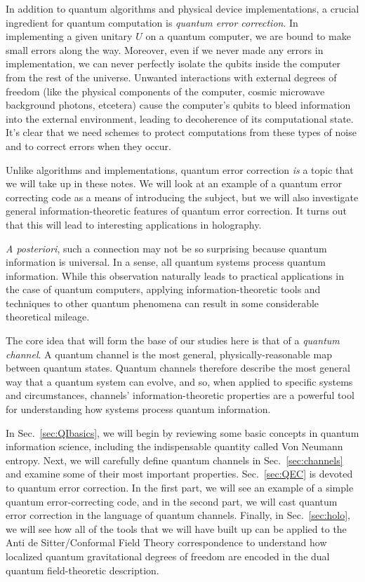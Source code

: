 \documentclass[a4paper,11pt]{article}
\newcommand{\Sec}[1]{Sec.~\ref{#1}}
\begin{document}
In addition to quantum algorithms and physical device implementations, a crucial ingredient for quantum computation is \emph{quantum error correction}.
In implementing a given unitary $U$ on a quantum computer, we are bound to make small errors along the way.
Moreover, even if we never made any errors in implementation, we can never perfectly isolate the qubits inside the computer from the rest of the universe.
Unwanted interactions with external degrees of freedom (like the physical components of the computer, cosmic microwave background photons, etcetera) cause the computer's qubits to bleed information into the external environment, leading to decoherence of its computational state.
It's clear that we need schemes to protect computations from these types of noise and to correct errors when they occur.

Unlike algorithms and implementations, quantum error correction \emph{is} a topic that we will take up in these notes.
We will look at an example of a quantum error correcting code as a means of introducing the subject, but we will also investigate general information-theoretic features of quantum error correction.
It turns out that this will lead to interesting applications in holography.

\emph{A posteriori}, such a connection may not be so surprising because quantum information is universal.
In a sense, all quantum systems process quantum information.
While this observation naturally leads to practical applications in the case of quantum computers, applying information-theoretic tools and techniques to other quantum phenomena can result in some considerable theoretical mileage.

The core idea that will form the base of our studies here is that of a \emph{quantum channel}.
A quantum channel is the most general, physically-reasonable map between quantum states.
Quantum channels therefore describe the most general way that a quantum system can evolve, and so, when applied to specific systems and circumstances, channels' information-theoretic properties are a powerful tool for understanding how systems process quantum information.

In \Sec{sec:QIbasics}, we will begin by reviewing some basic concepts in quantum information science, including the indispensable quantity called Von Neumann entropy.
Next, we will carefully define quantum channels in \Sec{sec:channels} and examine some of their most important properties.
\Sec{sec:QEC} is devoted to quantum error correction.
In the first part, we will see an example of a simple quantum error-correcting code, and in the second part, we will cast quantum error correction in the language of quantum channels.
Finally, in \Sec{sec:holo}, we will see how all of the tools that we will have built up can be applied to the Anti de Sitter/Conformal Field Theory correspondence to understand how localized quantum gravitational degrees of freedom are encoded in the dual quantum field-theoretic description.
\end{document}
